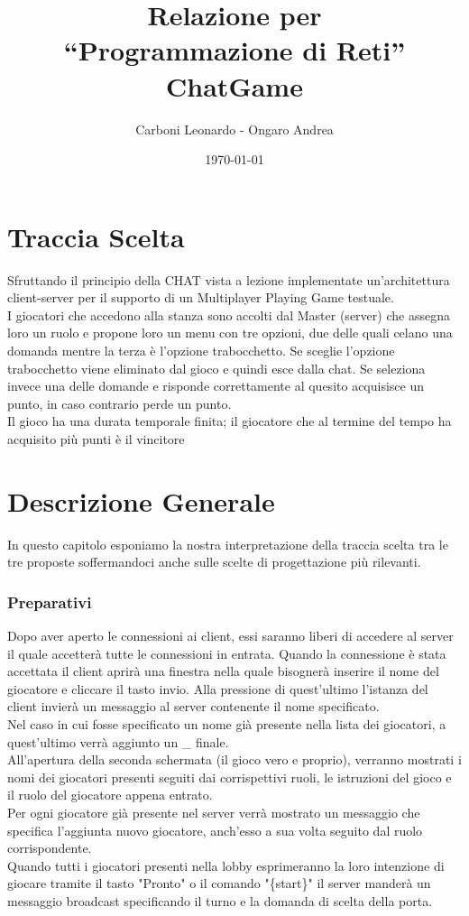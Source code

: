 \documentclass[a4paper,12pt]{report}
\title{Relazione per \\``Programmazione di Reti'' \\ ChatGame}
\author{Carboni Leonardo - Ongaro Andrea}
\date{\today}
\begin{document}
\maketitle

\tableofcontents
\thispagestyle{fancy}

\chapter{Traccia Scelta}
Sfruttando il principio della CHAT vista a lezione implementate un’architettura client-server per il supporto di un Multiplayer Playing Game testuale. \\
I giocatori che accedono alla stanza sono accolti dal Master (server) che assegna loro un ruolo e propone loro un menu con tre opzioni, due delle quali celano una domanda mentre la terza è l’opzione trabocchetto. Se sceglie l’opzione trabocchetto viene eliminato dal gioco e quindi esce dalla chat.
Se seleziona invece una delle domande e risponde correttamente al quesito acquisisce un punto, in caso contrario perde un punto.\\
Il gioco ha una durata temporale finita; il giocatore che al termine del tempo ha acquisito più punti è il vincitore

\chapter{Descrizione Generale}
In questo capitolo esponiamo la nostra interpretazione della traccia scelta tra le tre proposte soffermandoci anche sulle scelte di progettazione più rilevanti.

\subsection{Preparativi}
Dopo aver aperto le connessioni ai client, essi saranno liberi di accedere al server il quale accetterà tutte le connessioni in entrata. Quando la connessione è stata accettata il client
aprirà una finestra nella quale bisognerà inserire il nome del giocatore e cliccare il tasto invio. Alla pressione di quest'ultimo l'istanza del client invierà un messaggio al server contenente il nome specificato.\\
Nel caso in cui fosse specificato un nome già presente nella lista dei giocatori, a quest'ultimo verrà aggiunto un \_ finale.\\
All'apertura della seconda schermata (il gioco vero e proprio), verranno mostrati i nomi dei giocatori presenti seguiti dai corrispettivi ruoli, le istruzioni del gioco e il ruolo del giocatore appena entrato.\\
Per ogni giocatore già presente nel server verrà mostrato un messaggio che specifica l'aggiunta nuovo giocatore, anch'esso a sua volta seguito dal ruolo corrispondente. \\
Quando tutti i giocatori presenti nella lobby esprimeranno la loro intenzione di giocare tramite il tasto "Pronto" o il comando "\{start\}"
il server manderà un messaggio broadcast specificando il turno e la domanda di scelta della porta.\clearpage
\end{document}

